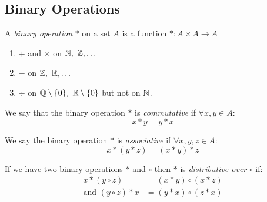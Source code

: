 \documentclass[../main.tex]{subfiles}
\begin{document}
\subsection{Binary Operations}
\begin{definition}
  A \textit{binary operation} $*$ on a set $A$ is a function $*: A \times A \to A$
\end{definition}
\begin{example}
  \begin{enumerate}
    \item $+$ and $\times$ on $\mathbb{N},\ \mathbb{Z},\ldots$
    \item $-$ on $\mathbb{Z},\ \mathbb{R},\ldots$
    \item $\div$ on $\mathbb{Q} \setminus \{0\},\ \mathbb{R} \setminus \{0\}$ but not on $\mathbb{N}$.
  \end{enumerate}
\end{example}
\begin{definition}[Commutative]
  We say that the binary operation $*$ is \textit{commutative} if $\forall x, y \in A$:
  \[
    x * y = y * x
  \]
\end{definition}
\begin{definition}[Associative]
  We say the binary operation $*$ is \textit{associative} if $\forall x, y, z \in A$:
  \[
    x * (y * z) = (x * y) * z
  \]
\end{definition}
\begin{definition}[Distributive]
  If we have two binary operations $*$ and $\circ$ then $*$ is \textit{distributive over} $\circ$ if:
  \begin{align*}
    x * (y \circ z) &= (x * y) \circ (x * z) \\
    \text{and } (y \circ z) * x &= (y * x) \circ (z * x)
  \end{align*}
\end{definition}
\end{document}
